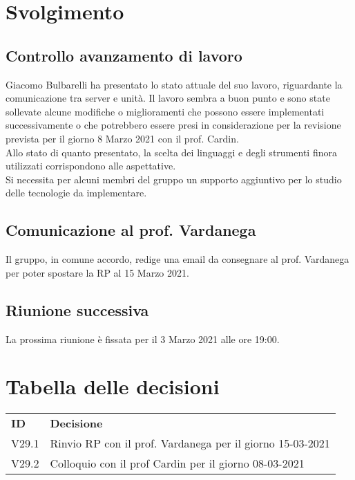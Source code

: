 \documentclass[]{article}
\begin{document}
	\newpage

	\section{Svolgimento}
		\subsection{Controllo avanzamento di lavoro}
		Giacomo Bulbarelli ha presentato lo stato attuale del suo lavoro, riguardante la comunicazione tra server e unità. Il lavoro sembra a buon punto e sono state sollevate alcune modifiche o miglioramenti che possono essere implementati successivamente o che potrebbero essere presi in considerazione per la revisione prevista per il giorno 8 Marzo 2021 con il prof. Cardin. \\
		Allo stato di quanto presentato, la scelta dei linguaggi e degli strumenti finora utilizzati corrispondono alle aspettative. \\
		Si necessita per alcuni membri del gruppo un supporto aggiuntivo per lo studio delle tecnologie da implementare.\\

		\subsection{Comunicazione al prof. Vardanega}
		Il gruppo, in comune accordo, redige una email da consegnare al prof. Vardanega per poter spostare la RP al 15 Marzo 2021.\\

	\subsection{Riunione successiva}
	La prossima riunione è fissata per il 3 Marzo 2021 alle ore 19:00.

	\newpage

	\section{Tabella delle decisioni}

	\begin{table} [h!]
		\begin{center}
			\begin{tabular} { m{2cm} m{14cm} }
				\rowcolor{lightgray}
				\textbf{ID} & \textbf{Decisione}\\
				V29.1 & Rinvio RP con il prof. Vardanega per il giorno 15-03-2021\\
				V29.2 & Colloquio con il prof Cardin per il giorno 08-03-2021
			\end{tabular}
		\end{center}
	\end{table}
\end{document}
